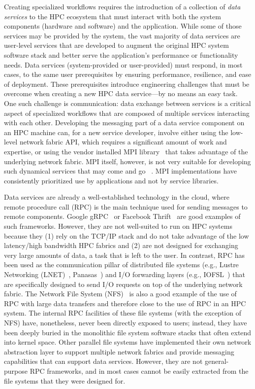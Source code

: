 \documentclass[11pt]{article}
\begin{document}
Creating specialized workflows requires the introduction of
a collection of \textit{data services} to the HPC ecosystem that must interact
with both the
system components (hardware and software) and the application.
While some of those services may be provided by the system, the vast majority
of data services are user-level services that are developed to augment the
original HPC system software stack and better serve the application's
performance or functionality needs. Data services (system-provided
or user-provided) must respond, in most cases, to the same user
prerequisites by ensuring performance, resilience, and ease of deployment.
These prerequisites introduce engineering challenges that
must be overcome when creating a new HPC data service---by no means an
easy task. One such challenge is communication: data exchange
between services is a critical aspect of
specialized workflows that are composed of multiple services interacting with
each other. Developing the messaging part of a data service component on an HPC
machine can, for a new service developer, involve either using the
low-level network fabric
API, which requires a significant amount of work and expertise, or using the vendor installed
MPI library~\cite{mpich} that takes advantage of the underlying network fabric. 
MPI itself, however, is not very suitable for developing such dynamical services that
may come and go
~\cite{Zounmevo2013}.
%
MPI implementations have consistently prioritized use
by applications and not by service libraries.

Data services are already a well-established technology in the cloud, where
remote procedure call (RPC) is the main technique used for sending messages
to remote components. Google gRPC~\cite{protobuf} or Facebook Thrift~\cite{Slee2007}
are good examples of such
frameworks. However, they are not well-suited to run on HPC systems because they (1)
rely on the TCP/IP stack and do not take advantage of the low latency/high
bandwidth HPC fabrics and (2) are not designed for exchanging very large amounts
of data, a task that is left to the user.
In contrast, RPC has been used as the communication pillar of
distributed file systems (e.g., Lustre Networking (LNET)~\cite{Wang2009},
Panasas~\cite{Welch2008}) and I/O forwarding layers
(e.g., IOFSL~\cite{Ali2009}) that are specifically designed to send I/O requests on top of the
underlying network fabric. The Network File System (NFS)~\cite{Sandberg1988}
is also a good example of the use of RPC with large data transfers and
therefore close to the use of RPC in an HPC system.
The internal RPC facilities of these file systems (with the exception of NFS) have,
nonetheless, never
been directly exposed to users; instead, they have been deeply buried in the
monolithic file system software stacks that often extend into kernel space.
Other parallel file systems have implemented their own network abstraction layer
to support multiple network fabrics
and provide messaging capabilities that can support data services. However, they are not
general-purpose RPC frameworks, and in most cases cannot be easily extracted
from the file systems that they were designed for.
\end{document}
